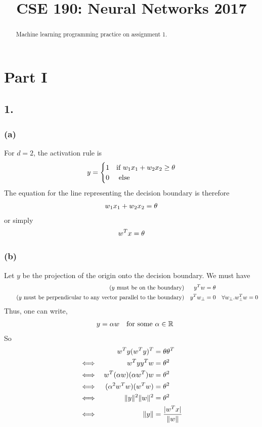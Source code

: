 \documentclass{article}
\title{CSE 190: Neural Networks 2017}
\author{
}
\newcommand\RR{\mathbb{R}}
\def\norm#1{\Vert #1 \Vert}
\def\abs#1{\vert #1 \vert}
\begin{document}
\maketitle

\begin{abstract}
    Machine learning programming practice on assignment 1.
\end{abstract}

\section*{Part I}
\subsection*{1.}
\subsubsection*{(a)}
For $d=2$, the activation rule is
\begin{align}
    && y &= \begin{cases} 1 & \text{if } w_{1}x_{1} + w_{2}x_{2} \geq \theta  \\ 0 &
        \text{ else} \end{cases} \notag
\end{align}
The equation for the line representing the decision boundary is therefore
\begin{align}
    && w_1 x_1 + w_2 x_2 &= \theta \notag 
\end{align}
or simply
\begin{align}
    && w^T x &= \theta \notag 
\end{align}
\subsubsection*{(b)}
Let $y$ be the projection of the origin onto the decision boundary. We must have
\begin{align}
    \tag*{($y$ must be on the boundary)}
    && y^T w &= \theta \notag \\
    \tag*{($y$ must be perpendicular to any vector parallel to the boundary)}
    && y^T w_{\perp} &= 0 & \forall w_{\perp}. w_{\perp}^{T} w = 0  \notag 
\end{align}
Thus, one can write,
\begin{align}
    && y &= \alpha w & \text{for some } \alpha \in \RR \notag 
\end{align}
So
\begin{align}
    && w^{T}y (w^{T} y)^{T} &= \theta \theta^{T} \notag \\
    \iff&& w^T y y^T w &= \theta^{2} \notag \\
    \iff&& w^T (\alpha w) (\alpha w^T) w &= \theta^{2} \notag \\
    \iff&& (\alpha^2 w^T w) (w^{T} w) &= \theta^{2} \notag \\
    \iff&& \norm{y}^2 \norm{w}^{2} &= \theta^{2} \notag \\
    \iff&& \norm{y}   &= \frac{\abs{w^T x}}{\norm{w}} \notag 
\end{align}
\end{document}
